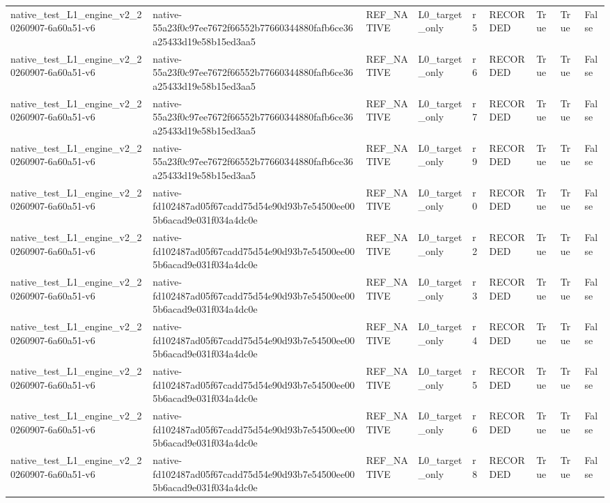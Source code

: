 \begin{tabular}{lllllllll}
native\_test\_L1\_engine\_v2\_20260907-6a60a51-v6 & native-55a23f0c97ee7672f66552b77660344880fafb6ce36a25433d19e58b15ed3aa5 & REF\_NATIVE & L0\_target\_only & r5 & RECORDED & True & True & False \\
native\_test\_L1\_engine\_v2\_20260907-6a60a51-v6 & native-55a23f0c97ee7672f66552b77660344880fafb6ce36a25433d19e58b15ed3aa5 & REF\_NATIVE & L0\_target\_only & r6 & RECORDED & True & True & False \\
native\_test\_L1\_engine\_v2\_20260907-6a60a51-v6 & native-55a23f0c97ee7672f66552b77660344880fafb6ce36a25433d19e58b15ed3aa5 & REF\_NATIVE & L0\_target\_only & r7 & RECORDED & True & True & False \\
native\_test\_L1\_engine\_v2\_20260907-6a60a51-v6 & native-55a23f0c97ee7672f66552b77660344880fafb6ce36a25433d19e58b15ed3aa5 & REF\_NATIVE & L0\_target\_only & r9 & RECORDED & True & True & False \\
native\_test\_L1\_engine\_v2\_20260907-6a60a51-v6 & native-fd102487ad05f67cadd75d54e90d93b7e54500ee005b6acad9e031f034a4dc0e & REF\_NATIVE & L0\_target\_only & r0 & RECORDED & True & True & False \\
native\_test\_L1\_engine\_v2\_20260907-6a60a51-v6 & native-fd102487ad05f67cadd75d54e90d93b7e54500ee005b6acad9e031f034a4dc0e & REF\_NATIVE & L0\_target\_only & r2 & RECORDED & True & True & False \\
native\_test\_L1\_engine\_v2\_20260907-6a60a51-v6 & native-fd102487ad05f67cadd75d54e90d93b7e54500ee005b6acad9e031f034a4dc0e & REF\_NATIVE & L0\_target\_only & r3 & RECORDED & True & True & False \\
native\_test\_L1\_engine\_v2\_20260907-6a60a51-v6 & native-fd102487ad05f67cadd75d54e90d93b7e54500ee005b6acad9e031f034a4dc0e & REF\_NATIVE & L0\_target\_only & r4 & RECORDED & True & True & False \\
native\_test\_L1\_engine\_v2\_20260907-6a60a51-v6 & native-fd102487ad05f67cadd75d54e90d93b7e54500ee005b6acad9e031f034a4dc0e & REF\_NATIVE & L0\_target\_only & r5 & RECORDED & True & True & False \\
native\_test\_L1\_engine\_v2\_20260907-6a60a51-v6 & native-fd102487ad05f67cadd75d54e90d93b7e54500ee005b6acad9e031f034a4dc0e & REF\_NATIVE & L0\_target\_only & r6 & RECORDED & True & True & False \\
native\_test\_L1\_engine\_v2\_20260907-6a60a51-v6 & native-fd102487ad05f67cadd75d54e90d93b7e54500ee005b6acad9e031f034a4dc0e & REF\_NATIVE & L0\_target\_only & r8 & RECORDED & True & True & False \\

\end{tabular}
